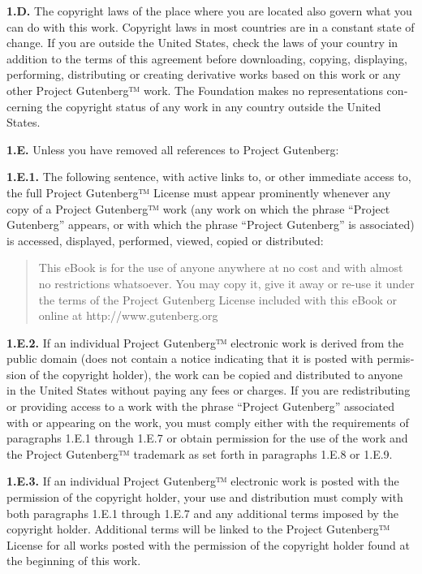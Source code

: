 \documentclass[a5paper]{book}
\begin{document}
\begin{german}
\begin{english}
\begin{pgfooter_env}
{\bfseries{1.D.}} The copyright laws of the place where you are located also
govern what you can do with this work. Copyright laws in most
countries are in a constant state of change. If you are outside the
United States, check the laws of your country in addition to the terms
of this agreement before downloading, copying, displaying, performing,
distributing or creating derivative works based on this work or any
other Project Gutenberg™ work.  The Foundation makes no
representations concerning the copyright status of any work in any
country outside the United States.\par

{\bfseries{1.E.}} Unless you have removed all references to Project Gutenberg:\par

{\bfseries{1.E.1.}} The following sentence, with active links to, or other
immediate access to, the full Project Gutenberg™ License must appear
prominently whenever any copy of a Project Gutenberg™ work (any work
on which the phrase “Project Gutenberg” appears, or with which the
phrase “Project Gutenberg” is associated) is accessed, displayed,
performed, viewed, copied or distributed:\par

\begin{quotation}
{\noindent}This eBook is for the use of anyone anywhere at no cost and with
almost no restrictions whatsoever. You may copy it, give it away or
re-use it under the terms of the Project Gutenberg License included
with this eBook or online at {http://www.gutenberg.org}\par
\end{quotation}

{\bfseries{1.E.2.}} If an individual Project Gutenberg™ electronic work is
derived from the public domain (does not contain a notice indicating
that it is posted with permission of the copyright holder), the work
can be copied and distributed to anyone in the United States without
paying any fees or charges. If you are redistributing or providing
access to a work with the phrase “Project Gutenberg” associated with
or appearing on the work, you must comply either with the requirements
of paragraphs 1.E.1 through 1.E.7 or obtain permission for the use of
the work and the Project Gutenberg™ trademark as set forth in
paragraphs 1.E.8 or 1.E.9.\par

{\bfseries{1.E.3.}} If an individual Project Gutenberg™ electronic work is
posted with the permission of the copyright holder, your use and
distribution must comply with both paragraphs 1.E.1 through 1.E.7 and
any additional terms imposed by the copyright holder. Additional terms
will be linked to the Project Gutenberg™ License for all works posted
with the permission of the copyright holder found at the beginning of
this work.\par


\end{pgfooter_env}
\end{english}
\end{german}
\end{document}
